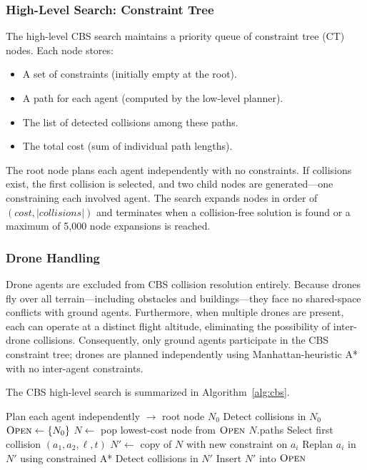 \documentclass[conference]{IEEEtran}
\begin{document}
\subsubsection{High-Level Search: Constraint Tree}
The high-level CBS search maintains a priority queue of constraint tree (CT) nodes. Each node stores:
\begin{itemize}
    \item A set of constraints (initially empty at the root).
    \item A path for each agent (computed by the low-level planner).
    \item The list of detected collisions among these paths.
    \item The total cost (sum of individual path lengths).
\end{itemize}

The root node plans each agent independently with no constraints. If collisions exist, the first collision is selected, and two child nodes are generated---one constraining each involved agent. The search expands nodes in order of $(cost, |collisions|)$ and terminates when a collision-free solution is found or a maximum of 5{,}000 node expansions is reached.

\subsubsection{Drone Handling}
Drone agents are excluded from CBS collision resolution entirely. Because drones fly over all terrain---including obstacles and buildings---they face no shared-space conflicts with ground agents. Furthermore, when multiple drones are present, each can operate at a distinct flight altitude, eliminating the possibility of inter-drone collisions. Consequently, only ground agents participate in the CBS constraint tree; drones are planned independently using Manhattan-heuristic A* with no inter-agent constraints.

The CBS high-level search is summarized in Algorithm~\ref{alg:cbs}.

\begin{algorithm}[t]
\caption{CBS High-Level Search}
\label{alg:cbs}
\begin{algorithmic}[1]
\STATE Plan each agent independently $\to$ root node $N_0$
\STATE Detect collisions in $N_0$
\STATE $\textsc{Open} \gets \{N_0\}$
    \STATE $N \gets$ pop lowest-cost node from $\textsc{Open}$
        \RETURN $N$.paths
    \ENDIF
    \STATE Select first collision $(a_1, a_2, \ell, t)$
        \STATE $N' \gets$ copy of $N$ with new constraint on $a_i$
        \STATE Replan $a_i$ in $N'$ using constrained A*
        \STATE Detect collisions in $N'$
        \STATE Insert $N'$ into $\textsc{Open}$
    \ENDFOR
\ENDWHILE
\end{algorithmic}
\end{algorithm}
\end{document}
